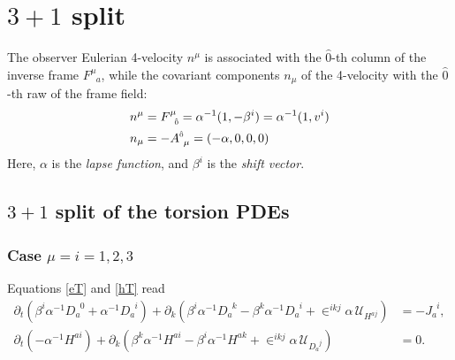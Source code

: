 \documentclass[
10pt, %
a4paper, %
oneside, %
headinclude,footinclude, %
BCOR5mm, %
]{scrartcl}
\newcommand{\IP}[1]{{\color{Red}[IP:\ \ #1]}}
\newcommand{\pd}[1]{\partial_{#1}}
\newcommand{\itetr}[2]{F^{#1}_{\phantom{#1}#2}}
\newcommand{\tetr}[2]{A^{#1}_{\phantom{#1}#2}}
\newcommand{\eT}[2]{D_{#1}^{\phantom{#1}#2}}	%
\newcommand{\hT}[2]{H^{#1#2}}	%
\newcommand{\LagST}{\mathcal{U}}%
\newcommand{\LCsymb}{\bm{\in}}    %
\newcommand{\NC}[2]{J^{\phantom{#1}#2}_{#1}}
\newcommand{\indlat}[1]{\hat{\mathsmaller{#1}}}
\newcommand{\lapse}{\alpha}
\newcommand{\shift}[1]{\beta^{#1}}
\begin{document}


\section{$ 3+1 $ split}	\label{sec.31}

The observer Eulerian 4-velocity $ n^\mu $ is associated with the $ \hat{0} $-th column of the 
inverse frame $ \itetr{\mu}{a} $, while the covariant components $ n_\mu $ of the 4-velocity with 
the $ 
\hat{0} $-th raw of the frame field:
\begin{subequations}
	\begin{align}
		n^{\mu} &= \itetr{\mu}{\indlat{0}}  = \lapse^{-1}(1,-\shift{i}) = \lapse^{-1}(1,v^i)\\
		n_\mu   &= - \tetr{\indlat{0}}{\mu} = (-\lapse,0,0,0) 
	\end{align}
\end{subequations}
Here, $ \lapse $ is the \emph{lapse function}, and $ \shift{i} $ is the \emph{shift vector}.




\subsection{$ 3+1 $ split of the torsion PDEs}	\label{ssec.31.tors}

\subsubsection{Case $ \mu = i=1,2,3 $} 

Equations \eqref{eT} and \eqref{hT} read
\begin{subequations}\label{eqn.tpo.1}
	\begin{align}
		\pd{t} (\shift{i} \lapse^{-1} \eT{a}{0} + \lapse^{-1}\eT{a}{i}) + \pd{k}(\shift{i} 
		\lapse^{-1}\eT{a}{k} - \shift{k}\lapse^{-1}\eT{a}{i}  + \LCsymb^{ikj} \lapse \,
		\LagST_{\hT{a}{j}}) & 
		= -\NC{a}{i}, \\[2mm]
%
		\pd{t} (-\lapse^{-1}\hT{a}{i}) + \pd{k}(\shift{k} 
		\lapse^{-1}\hT{a}{i} - \shift{i}\lapse^{-1}\hT{a}{k}  + \LCsymb^{ikj} \lapse \,
		\LagST_{\eT{a}{j}}) & 
		= 0 .
	\end{align}
\end{subequations}
\end{document}
